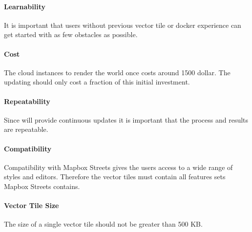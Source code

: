 \paragraph{Learnability}

It is important that users without previous vector tile or docker experience can get started with as few obstacles as possible.

\paragraph{Cost}

The cloud instances to render the world once costs around 1500 dollar. The updating should only cost a fraction of this initial investment.

\paragraph{Repeatability}

Since \osmvt{} will provide continuous updates it is important that the process and results are repeatable.

\paragraph{Compatibility}

Compatibility with Mapbox Streets gives the users access
to a wide range of styles and editors. Therefore the vector tiles must contain
all features sets Mapbox Streets contains.

\paragraph{Vector Tile Size}

The size of a single vector tile should not be greater than 500 KB.
